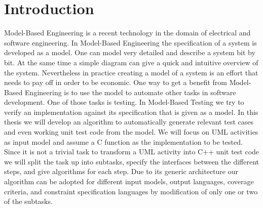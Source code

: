 \chapter{Introduction}
Model-Based Engineering is a recent technology in the domain of electrical and software engineering. In Model-Based Engineering the specification of a system is developed as a model.
One can model very detailed and describe a system bit by bit. At the same time a simple diagram can give a quick and intuitive overview of the system. 
Nevertheless in practice creating a model of a system is an effort that needs to pay off in order to be economic.
One way to get a benefit from Model-Based Engineering is to use the model to automate other tasks in software development. One of those tasks is testing. In Model-Based Testing we try to verify an implementation against its specification that is given as a model. In this thesis we will develop an algorithm to automatically generate relevant test cases and even working unit test code from the model. We will focus on UML activities as input model and assume a C function as the implementation to be tested. Since it is not a trivial task to transform a UML activity into C++ unit test code we will split the task up into subtasks, specify the interfaces between the different steps, and give algorithms for each step. Due to its generic architecture our algorithm can be adopted for different input models, output languages, coverage criteria, and constraint specification languages by modification of only one or two of the subtasks.
